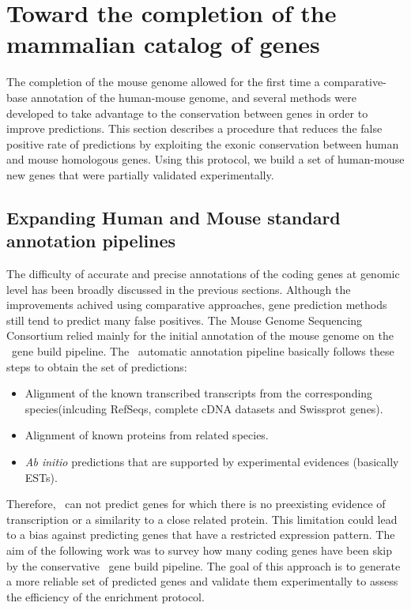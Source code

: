 

\newpage
\chapter{Toward the completion of the mammalian catalog of genes}

The completion of the mouse genome allowed for the first time a
comparative-base annotation of the human-mouse genome, and several
methods were developed to take advantage to the conservation between
genes in order to improve predictions. This section describes a
procedure that reduces the false positive rate of predictions by
exploiting the exonic conservation between human and mouse homologous
genes. Using this protocol, we build a set of human-mouse new genes
that were partially validated experimentally.

\section{Expanding Human and Mouse standard annotation pipelines}

The difficulty of accurate and precise annotations of the coding genes
at genomic level has been broadly discussed in the previous
sections. Although the improvements achived using comparative
approaches, gene prediction methods still tend to predict many false
positives. The Mouse Genome Sequencing Consortium relied mainly for
the initial annotation of the mouse genome on the \ensembl\ gene build
pipeline. The \ensembl\ automatic annotation pipeline basically
follows these steps to obtain the set of predictions:

\begin{itemize}
\item Alignment of the known transcribed transcripts from the 
corresponding species(inlcuding RefSeqs, complete cDNA datasets and
Swissprot genes).

\item Alignment of known proteins from related species.

\item \textit{Ab initio} predictions that are supported by experimental 
evidences (basically ESTs).
\end{itemize}

Therefore, \ensembl\ can not predict genes for which there is no
preexisting evidence of transcription or a similarity to a close
related protein. This limitation could lead to a bias against
predicting genes that have a restricted expression pattern. The aim of
the following work was to survey how many coding genes have been skip
by the conservative \ensembl\ gene build pipeline. The goal of this
approach is to generate a more reliable set of predicted genes and
validate them experimentally to assess the efficiency of the
enrichment protocol.


